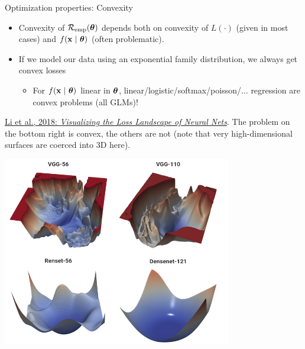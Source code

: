\documentclass[11pt,compress,t,notes=noshow, xcolor=table]{beamer}
\begin{document}
\begin{vbframe}{Optimization properties: Convexity}

\begin{itemize}
  \setlength\itemsep{1em}
  \item Convexity of $\mathcal{R}_{\text{emp}}(\bm{\theta})$ depends both on convexity of $L(\cdot)$ (given in most cases) and $f(\mathbf{x} ~|~ \bm{\theta})$ (often problematic).
  \item If we model our data using an exponential family distribution, we always get convex losses
  \begin{itemize} 
    \item For $f(\mathbf{x} ~|~ \bm{\theta})$ linear in $\bm{\theta}$, linear/logistic/softmax/poisson/$\ldots$ regression are convex problems (all GLMs)! 
  \end{itemize}  
\end{itemize} 

\vfill

\begin{minipage}[b]{0.5\textwidth}
  \footnotesize \raggedright
  \href{https://arxiv.org/pdf/1712.09913.pdf}{Li et al., 2018: 
  \textit{Visualizing the Loss Landscape of Neural Nets}}. 
  The problem on the bottom right is convex, the others are not (note that 
  very high-dimensional surfaces are coerced into 3D here).  
  \\
  \phantom{foo}
\end{minipage}%
\begin{minipage}[b]{0.05\textwidth}
  \phantom{foo}
\end{minipage}%
\begin{minipage}[b]{0.45\textwidth}
  \includegraphics[width=0.75\textwidth]{
  figure_man/convex-vs-nonconfex-landscape}
\end{minipage}%

\end{vbframe}
\end{document}
